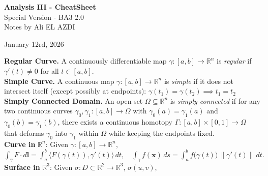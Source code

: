 \documentclass[8pt]{article}
\begin{document}
\begin{titlepage}
	\centering
	\vspace*{1cm}
	{\Huge \textbf{Analysis III - CheatSheet}} \\
	\vspace{10px}
	{\LARGE Special Version - BA3 2.0} \\
	\vspace*{1cm}
	{\Large Notes by Ali EL AZDI} \\
	\vfill
	\vspace*{100px}

	{\large January 12rd, 2026}
	\vspace*{20px}
\end{titlepage}

\vspace*{-20px}
\noindent\textbf{Regular Curve.} A continuously differentiable map
$\gamma : [a,b] \to \mathbb{R}^n$
is \emph{regular} if $\gamma'(t) \neq 0$ for all $t \in [a,b]$. \\
\noindent\textbf{Simple Curve.}
A continuous map
$\gamma : [a,b] \to \mathbb{R}^n$
is \emph{simple} if it does not intersect itself (except possibly at endpoints):
$\gamma(t_1) = \gamma(t_2) \implies t_1 = t_2$ \\
\noindent\textbf{Simply Connected Domain.}
An open set $\Omega \subseteq \mathbb{R}^n$ is \emph{simply connected} if for any two continuous curves
$\gamma_0, \gamma_1 : [a,b] \to \Omega$
with $\gamma_0(a) = \gamma_1(a)$ and $\gamma_0(b) = \gamma_1(b)$,
there exists a continuous homotopy
$\Gamma : [a,b]\times[0,1] \to \Omega$
that deforms $\gamma_0$ into $\gamma_1$ within $\Omega$ while keeping the endpoints fixed.\\[-2pt]
\noindent\textbf{Curve in } $\mathbb{R}^n$: Given $\gamma : [a,b] \to \mathbb{R}^n$,$ \int_{\gamma} F \cdot d\mathbf{l} = \int_a^b \big\langle F(\gamma(t)), \gamma'(t)\big\rangle \, dt, \quad \int_{\gamma} f(\mathbf{x}) \, ds = \int_a^b f\big(\gamma(t)\big)\,\|\gamma'(t)\| \, dt.$  \vspace{-50px}
\\
\noindent\textbf{Surface in } $\mathbb{R}^3$:
Given $\sigma : D \subset \mathbb{R}^2 \to \mathbb{R}^3$, $\sigma(u,v)$,
\vspace{-10px}
\end{document}
